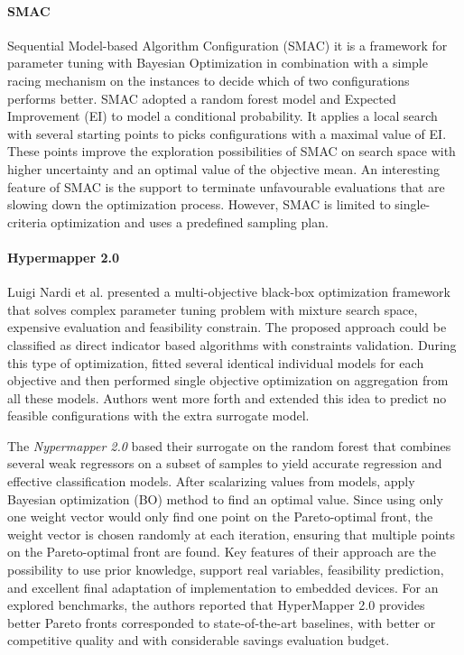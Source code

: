         \paragraph{SMAC} Sequential Model-based Algorithm Configuration (SMAC)\cite{HutterHL11, smac-2017} it is a framework for parameter tuning with Bayesian Optimization in combination with a simple racing mechanism on the instances to decide which of two configurations performs better.
        SMAC adopted a random forest model and Expected Improvement (EI) to model a conditional probability. It applies a local search with several starting points to picks configurations with a maximal value of EI. These points improve the exploration possibilities of SMAC on search space with higher uncertainty and an optimal value of the objective mean. 
        An interesting feature of SMAC is the support to terminate unfavourable evaluations that are slowing down the optimization process. However, SMAC is limited to single-criteria optimization and uses a predefined sampling plan.

        \paragraph{Hypermapper 2.0} Luigi Nardi et al. \cite{nardi2019practical} presented a multi-objective black-box optimization framework that solves complex parameter tuning problem with mixture search space, expensive evaluation and feasibility constrain.
        The proposed approach could be classified as direct indicator based algorithms with constraints validation. During this type of optimization, fitted several identical individual models for each objective and then performed single objective optimization on aggregation from all these models. Authors went more forth and extended this idea to predict no feasible configurations with the extra surrogate model.
        
        The \emph{Nypermapper 2.0} based their surrogate on the random forest that combines several weak regressors on a subset of samples to yield accurate regression and effective classification models. After scalarizing values from models, apply Bayesian optimization (BO) method to find an optimal value.  Since using only one weight vector would only find one point on the Pareto-optimal front, the weight vector is chosen randomly at each iteration, ensuring that multiple points on the Pareto-optimal front are found. Key features of their approach are the possibility to use prior knowledge, support real variables, feasibility prediction, and excellent final adaptation of implementation to embedded devices. For an explored benchmarks, the authors reported that HyperMapper 2.0 provides better Pareto fronts corresponded to state-of-the-art baselines, with better or competitive quality and with considerable savings evaluation budget.
        

